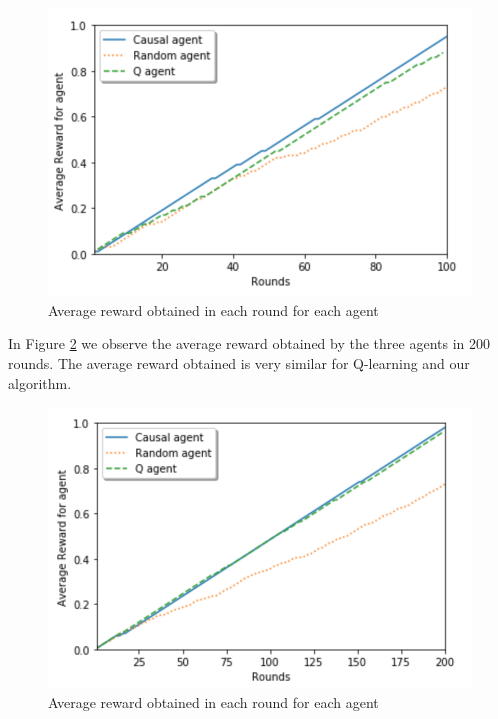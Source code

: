 \documentclass[letterpaper]{article} %
\theoremstyle{plain}
\begin{document}
\begin{figure}[ht]
\vskip 0.2in
\begin{center}
\centerline{\includegraphics[width=\columnwidth]{100_rounds_format.png}}
\caption{Average reward obtained in each round for each agent}
\label{100_rounds}
\end{center}
\vskip -0.2in
\end{figure}

In Figure \ref{200_rounds} we observe the average reward obtained by the three agents in 200 rounds. The average reward obtained is very similar for Q-learning and our algorithm.

\begin{figure}[ht]
\vskip 0.2in
\begin{center}
\centerline{\includegraphics[width=\columnwidth]{200_rounds_format.png}}
\caption{Average reward obtained in each round for each agent}
\label{200_rounds}
\end{center}
\vskip -0.2in
\end{figure}
\end{document}
